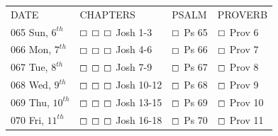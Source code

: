 \documentclass[11pt,landscape,twocolumn,letterpaper]{article}
\begin{document}
\begin{tabular}{p{0.85in}p{1.25in}p{1.2in}p{1.2in}}
DATE & CHAPTERS & PSALM & PROVERB \\
\tiny 065 \normalsize Sun, $6^{th}$ & $\boxempty$ $\boxempty$ $\boxempty$ \hspace{.05in} \textcolor[rgb]{1.00,0.00,0.00}{Josh 1-3} & $\boxempty$ \hspace{.05in} \textcolor[rgb]{0.00,1.00,0.00}{Ps 65} & $\boxempty$ \hspace{.05in} \textcolor[rgb]{0.00,0.00,1.00}{Prov 6}  \\

\tiny 066 \normalsize Mon, $7^{th}$ & $\boxempty$ $\boxempty$ $\boxempty$ \hspace{.05in} \textcolor[rgb]{1.00,0.00,0.00}{Josh 4-6} & $\boxempty$ \hspace{.05in} \textcolor[rgb]{0.00,1.00,0.00}{Ps 66} & $\boxempty$ \hspace{.05in} \textcolor[rgb]{0.00,0.00,1.00}{Prov 7}  \\

\tiny 067 \normalsize Tue, $8^{th}$ & $\boxempty$ $\boxempty$ $\boxempty$ \hspace{.05in} \textcolor[rgb]{1.00,0.00,0.00}{Josh 7-9} & $\boxempty$ \hspace{.05in} \textcolor[rgb]{0.00,1.00,0.00}{Ps 67} & $\boxempty$ \hspace{.05in} \textcolor[rgb]{0.00,0.00,1.00}{Prov 8}  \\

\tiny 068 \normalsize Wed, $9^{th}$ & $\boxempty$ $\boxempty$ $\boxempty$ \hspace{.05in} \textcolor[rgb]{1.00,0.00,0.00}{Josh 10-12} & $\boxempty$ \hspace{.05in} \textcolor[rgb]{0.00,1.00,0.00}{Ps 68} & $\boxempty$ \hspace{.05in} \textcolor[rgb]{0.00,0.00,1.00}{Prov 9}  \\

\tiny 069 \normalsize Thu, $10^{th}$ & $\boxempty$ $\boxempty$ $\boxempty$ \hspace{.05in} \textcolor[rgb]{1.00,0.00,0.00}{Josh 13-15} & $\boxempty$ \hspace{.05in} \textcolor[rgb]{0.00,1.00,0.00}{Ps 69} & $\boxempty$ \hspace{.05in} \textcolor[rgb]{0.00,0.00,1.00}{Prov 10}  \\

\tiny 070 \normalsize Fri, $11^{th}$ & $\boxempty$ $\boxempty$ $\boxempty$ \hspace{.05in} \textcolor[rgb]{1.00,0.00,0.00}{Josh 16-18} & $\boxempty$ \hspace{.05in} \textcolor[rgb]{0.00,1.00,0.00}{Ps 70} & $\boxempty$ \hspace{.05in} \textcolor[rgb]{0.00,0.00,1.00}{Prov 11}  \\


\end{tabular}
\end{document}
